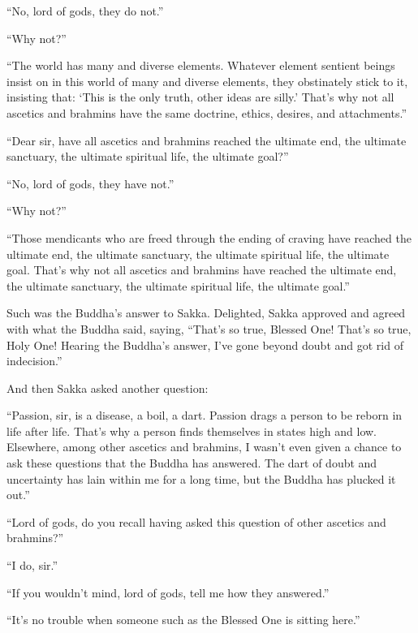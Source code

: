 \documentclass[12pt,openany]{book}%
\begin{document}
“No, lord of gods, they do not.” 

“Why not?” 

“The world has many and diverse elements. Whatever element sentient beings insist on in this world of many and diverse elements, they obstinately stick to it, insisting that: ‘This is the only truth, other ideas are silly.’ That’s why not all ascetics and brahmins have the same doctrine, ethics, desires, and attachments.” 

“Dear sir, have all ascetics and brahmins reached the ultimate end, the ultimate sanctuary, the ultimate spiritual life, the ultimate goal?” 

“No, lord of gods, they have not.” 

“Why not?” 

“Those mendicants who are freed through the ending of craving have reached the ultimate end, the ultimate sanctuary, the ultimate spiritual life, the ultimate goal. That’s why not all ascetics and brahmins have reached the ultimate end, the ultimate sanctuary, the ultimate spiritual life, the ultimate goal.” 

Such was the Buddha’s answer to Sakka. Delighted, Sakka approved and agreed with what the Buddha said, saying, “That’s so true, Blessed One! That’s so true, Holy One! Hearing the Buddha’s answer, I’ve gone beyond doubt and got rid of indecision.” 

And then Sakka asked another question: 

“Passion, sir, is a disease, a boil, a dart. Passion drags a person to be reborn in life after life. That’s why a person finds themselves in states high and low. Elsewhere, among other ascetics and brahmins, I wasn’t even given a chance to ask these questions that the Buddha has answered. The dart of doubt and uncertainty has lain within me for a long time, but the Buddha has plucked it out.” 

“Lord of gods, do you recall having asked this question of other ascetics and brahmins?” 

“I do, sir.” 

“If you wouldn’t mind, lord of gods, tell me how they answered.” 

“It’s no trouble when someone such as the Blessed One is sitting here.” 
\end{document}
